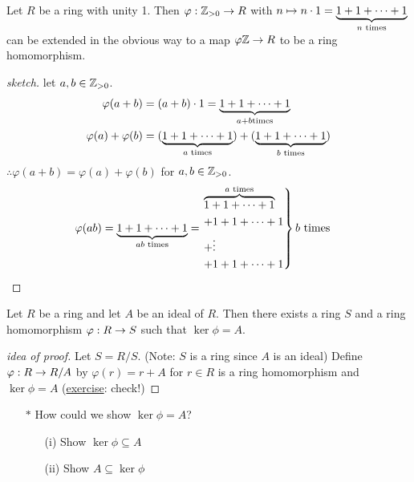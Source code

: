 \documentclass[]{article}
\begin{document}
\begin{theorem}
	Let $R$ be a ring with unity 1. Then $\varphi:\mb Z_{>0}\ra R$ with $n\mapsto n\cdot 1 = \ub{n\text{ times}}{1+1+\dots+1}$ can be extended in the obvious way to a map $\varphi\mb Z\ra R$ to be a ring homomorphism.
\end{theorem}
\begin{proof}
	[sketch] let $a,b\in\mb Z_{>0}$.
	\begin{align*}
		\varphi(a+b) &= (a+b)\cdot1 = \ub{a+b\text{times}}{1+1+\dots+1} \\
		\varphi(a)+\varphi(b) &= (\ub{a\text{ times}}{1+1+\dots+1}) + (\ub{b\text{ times}}{1+1+\dots+1})
	\end{align*}
	$\therefore \varphi(a+b)=\varphi(a)+\varphi(b)$ for $a,b\in\mb Z_{>0}$.
	\begin{align*}
		\varphi(ab) &= \ub{ab\text{ times}}{1+1+\dots+1}
					= \begin{rcases} \ob{a\text{ times}}{1+1+\dots+1} \\ + 1+1+\dots+1 \\ +\vdots \\ + 1+1+\dots+1 \end{rcases} b\text{ times}
	\end{align*}
\end{proof}
\begin{theorem}
	Let $R$ be a ring and let $A$ be an ideal of $R$. Then there exists a ring $S$ and a ring homomorphism $\varphi:R\ra S$ such that $\ker\phi=A$.
\end{theorem}
\begin{proof}
	[idea of proof] Let $S=R/S$. (Note: $S$ is a ring since $A$ is an ideal)
	Define $\varphi:R\ra R/A$ by $\varphi(r)=r+A$ for $r\in R$ is a ring homomorphism and \ul{$\ker\phi=A$} (\ul{exercise}: check!)
\end{proof}
\begin{enumerate}
	\item[$*$] How could we show $\ker\phi=A$?
		\begin{itemize}
			\item[(i)] Show $\ker\phi\subseteq A$
			\item[(ii)] Show $A\subseteq\ker\phi$
		\end{itemize}
\end{enumerate}
\end{document}

